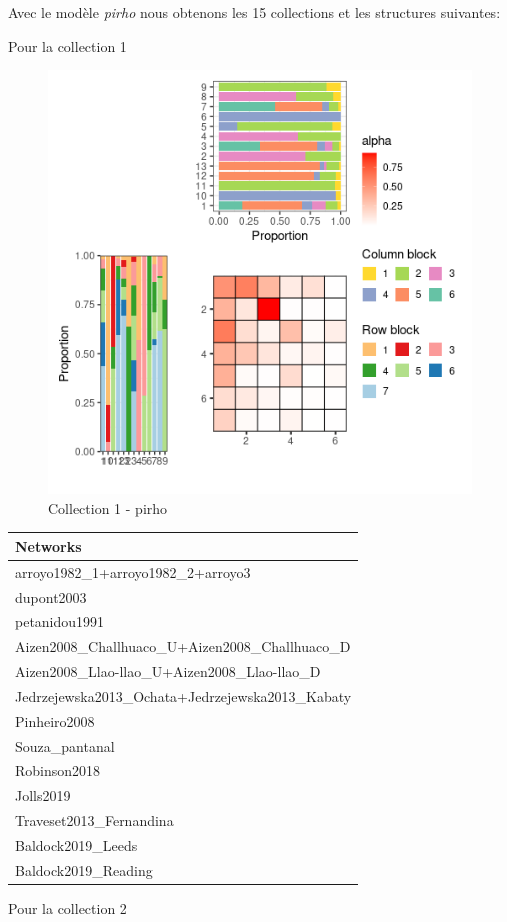 Avec le modèle \emph{pirho} nous obtenons les 15 collections et les
structures suivantes:

Pour la collection 1

\begin{figure}
\centering
\includegraphics{figure/pirho_meso_plot-1.png}
\caption{Collection 1 - pirho}
\end{figure}

\begin{longtable}[]{@{}l@{}}
\toprule
Networks\tabularnewline
\midrule
\endhead
arroyo1982\_1+arroyo1982\_2+arroyo3\tabularnewline
dupont2003\tabularnewline
petanidou1991\tabularnewline
Aizen2008\_Challhuaco\_U+Aizen2008\_Challhuaco\_D\tabularnewline
Aizen2008\_Llao-llao\_U+Aizen2008\_Llao-llao\_D\tabularnewline
Jedrzejewska2013\_Ochata+Jedrzejewska2013\_Kabaty\tabularnewline
Pinheiro2008\tabularnewline
Souza\_pantanal\tabularnewline
Robinson2018\tabularnewline
Jolls2019\tabularnewline
Traveset2013\_Fernandina\tabularnewline
Baldock2019\_Leeds\tabularnewline
Baldock2019\_Reading\tabularnewline
\bottomrule
\end{longtable}

Pour la collection 2

